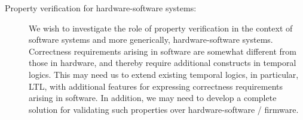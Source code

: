 \begin{description}
\item [Property verification for hardware-software systems:]
	We wish to investigate the role of property verification 
	in the context of software systems and more generically, hardware-software 
	systems.
	Correctness requirements arising in software are somewhat different 
	from those in hardware, and thereby require additional constructs in 
	temporal logics. This may need us to extend existing temporal logics, 
	in particular, LTL, with additional features for expressing correctness 
	requirements arising in software. In addition, we may need to develop a complete 
	solution for validating such properties over hardware-software / firmware.
\end{description}

